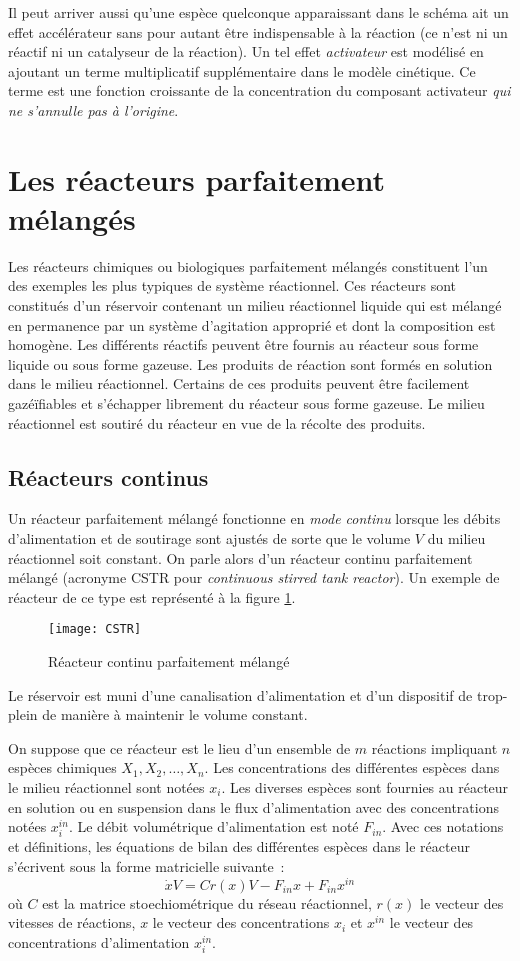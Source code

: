 Il peut arriver aussi qu'une espèce  quelconque apparaissant dans le schéma 
ait un effet accélérateur sans pour autant être indispensable 
à la réaction
(ce n'est ni un réactif ni un catalyseur de la réaction). Un tel effet {\it activateur} 
est modélisé en ajoutant un
terme multiplicatif supplémentaire dans le modèle  cinétique. Ce terme est
une fonction croissante de la 
concentration du composant activateur {\em qui ne s'annulle pas à l'origine}.

\section{Les réacteurs parfaitement mélangés}

Les réacteurs chimiques ou biologiques parfaitement
mélangés constituent l'un des exemples les
plus typiques de système réactionnel. Ces réacteurs sont constitués d'un
réservoir contenant un milieu réactionnel liquide qui est mélangé en
permanence par un système d'agitation approprié et dont la composition
est homogène. Les différents réactifs peuvent être fournis
au réacteur sous forme liquide ou sous forme gazeuse. Les produits de réaction
sont formés en solution dans le milieu réactionnel. Certains de ces produits
peuvent être facilement gazéïfiables et s'échapper librement du réacteur
sous forme gazeuse. Le milieu réactionnel est soutiré du réacteur en vue de
la récolte des produits.

\subsection {Réacteurs continus}

Un réacteur parfaitement mélangé fonctionne en {\em mode continu} lorsque les
débits d'alimentation et de soutirage sont ajustés de sorte que le volume $V$
du milieu réactionnel soit constant. On parle alors d'un réacteur continu
parfaitement mélangé (acronyme CSTR pour {\em
continuous stirred tank reactor}). Un exemple de réacteur de ce type est
représenté à la figure \ref{Fig:CSTR}. 
\begin{figure}[htbp] 
   \centering
   \texttt{[image: CSTR]} 
   \caption{Réacteur continu parfaitement mélangé}
   \label{Fig:CSTR}
\end{figure}
Le réservoir est muni d'une canalisation d'alimentation et d'un dispositif de
trop-plein de manière à maintenir le volume constant.

On suppose que ce réacteur est le lieu d'un ensemble de $m$ réactions
impliquant $n$ espèces chimiques $X_1, X_2, \dots , X_n$. Les concentrations
des différentes espèces dans le milieu réactionnel sont notées  $x_i$. Les
diverses espèces sont fournies au réacteur en solution ou en suspension dans
le flux d'alimentation avec des concentrations notées $x_i^{in}$.
Le débit volumétrique d'alimentation est noté $F_{in}$. Avec ces notations et
définitions, les équations de bilan des différentes espèces dans le réacteur
s'écrivent sous la forme matricielle suivante~:
$$
\dot xV = Cr(x)V - F_{in}x + F_{in}x^{in}
$$
où $C$ est la matrice stoechiométrique du réseau réactionnel, $r(x)$ le vecteur
des vitesses de réactions, $x$ le vecteur des concentrations $x_i$ et $x^{in}$ le
vecteur des concentrations d'alimentation $x_i^{in}$.

